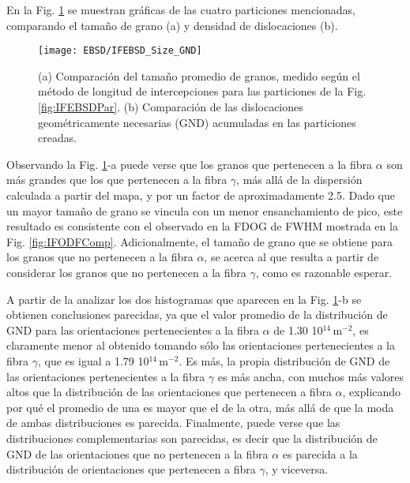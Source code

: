 En la Fig. \ref{fig:IFEBSDVs} se muestran gráficas de las cuatro particiones mencionadas, comparando el tamaño de grano (a) y densidad de dislocaciones (b).

\begin{figure}[!htb]
  \centering
  \texttt{[image: EBSD/IFEBSD\_Size\_GND]}
  \caption{(a) Comparación del tamaño promedio de granos, medido según el método de longitud de intercepciones para las particiones de la Fig. \ref{fig:IFEBSDPar}. (b) Comparación de las dislocaciones geométricamente necesarias (GND) acumuladas en las particiones creadas.}
  \label{fig:IFEBSDVs}
\end{figure}

Observando la Fig. \ref{fig:IFEBSDVs}-a puede verse que los granos que pertenecen a la fibra $\alpha$ son más grandes que los que pertenecen a la fibra $\gamma$, más allá de la dispersión calculada a partir del mapa, y por un factor de aproximadamente 2.5.
Dado que un mayor tamaño de grano se vincula con un menor ensanchamiento de pico, este resultado es consistente con el observado en la FDOG de FWHM mostrada en la Fig. \ref{fig:IFODFComp}.
Adicionalmente, el tamaño de grano que se obtiene para los granos que no pertenecen a la fibra $\alpha$, se acerca al que resulta a partir de considerar los granos que no pertenecen a la fibra $\gamma$, como es razonable esperar.

A partir de la analizar los dos histogramas que aparecen en la Fig. \ref{fig:IFEBSDVs}-b se obtienen conclusiones parecidas, ya que el valor promedio de la distribución de GND para las orientaciones pertenecientes a la fibra $\alpha$ de 1.30 10$^{14}$\,m$^{-2}$, es claramente menor al obtenido tomando sólo las orientaciones pertenecientes a la fibra $\gamma$, que es igual a 1.79 10$^{14}$\,m$^{-2}$.
Es más, la propia distribución de GND de las orientaciones pertenecientes a la fibra $\gamma$ es más ancha, con muchos más valores altos que la distribución de las orientaciones que pertenecen a fibra $\alpha$, explicando por qué el promedio de una es mayor que el de la otra, más allá de que la moda de ambas distribuciones es parecida.
Finalmente, puede verse que las distribuciones complementarias son parecidas, es decir que la distribución de GND de las orientaciones que no pertenecen a la fibra $\alpha$ es parecida a la distribución de orientaciones que pertenecen a fibra $\gamma$, y viceversa.
